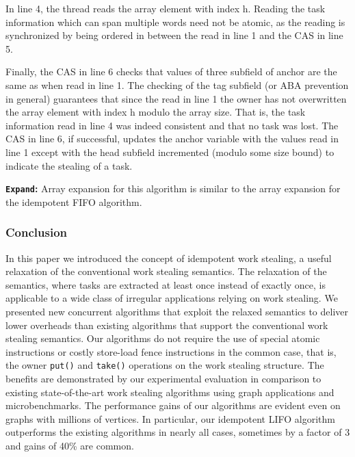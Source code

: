 In line 4, the thread reads the array element with index h. Reading
the task information which can span multiple words need not be atomic,
as the reading is synchronized by being ordered in between the read in
line 1 and the CAS in line 5.

Finally, the CAS in line 6 checks that values of three subfield of
anchor are the same as when read in line 1. The checking of the tag
subfield (or ABA prevention in general) guarantees that since the read
in line 1 the owner has not overwritten the array element with index h
modulo the array size. That is, the task information read in line 4
was indeed consistent and that no task was lost. The CAS in line 6, if
successful, updates the anchor variable with the values read in line 1
except with the head subfield incremented (modulo some size bound) to
indicate the stealing of a task.

\textbf{\lstinline!Expand!:} Array expansion for this algorithm is
similar to the array expansion for the idempotent FIFO algorithm.

\subsubsection{Conclusion}

In this paper we introduced the concept of idempotent work stealing, a
useful relaxation of the conventional work stealing semantics. The
relaxation of the semantics, where tasks are extracted at least once
instead of exactly once, is applicable to a wide class of irregular
applications relying on work stealing. We presented new concurrent
algorithms that exploit the relaxed semantics to deliver lower
overheads than existing algorithms that support the conventional work
stealing semantics. Our algorithms do not require the use of special
atomic instructions or costly store-load fence instructions in the
common case, that is, the owner \lstinline!put()! and \lstinline!take()!
operations on the work stealing structure. The benefits are
demonstrated by our experimental evaluation in comparison to existing
state-of-the-art work stealing algorithms using graph applications and
microbenchmarks. The performance gains of our algorithms are evident
even on graphs with millions of vertices. In particular, our
idempotent LIFO algorithm outperforms the existing algorithms in
nearly all cases, sometimes by a factor of 3 and gains of 40\% are
common.



